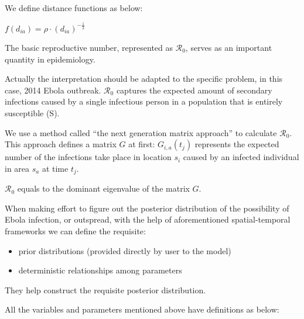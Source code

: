 \documentclass[11pt]{article}
\begin{document}
We define distance functions as below: 

\begin{center}
    $f(d_{ia}) = \rho \cdot (d_{ia})^{-\frac{1}{2}}$
\end{center}

The basic reproductive number, represented as $\mathcal{R}_0$, serves as an important quantity in epidemiology. 

Actually the interpretation should be adapted to the specific problem, in this case, 2014 Ebola outbreak. $\mathcal{R}_0$ captures the expected amount of secondary infections caused by a single infectious person in a population that is entirely susceptible (S). 

We use a method called ``the next generation matrix approach'' to calculate $\mathcal{R}_0$. This approach defines a matrix $G$ at first: $G_{i,a}(t_j)$ represents the expected number of the infections take place in location $s_i$ caused by an infected individual in area $s_a$ at time $t_j$.

$\mathcal{R}_0$ equals to the dominant eigenvalue of the matrix $G$.

When making effort to figure out the posterior distribution of the possibility of Ebola infection, or outspread, with the help of aforementioned spatial-temporal frameworks we can define the requisite:

\begin{itemize}
\item prior distributions (provided directly by user to the model)
\item deterministic relationships among parameters
\end{itemize}

They help construct the requisite posterior distribution. 

All the variables and parameters mentioned above have definitions as below:
\end{document}
